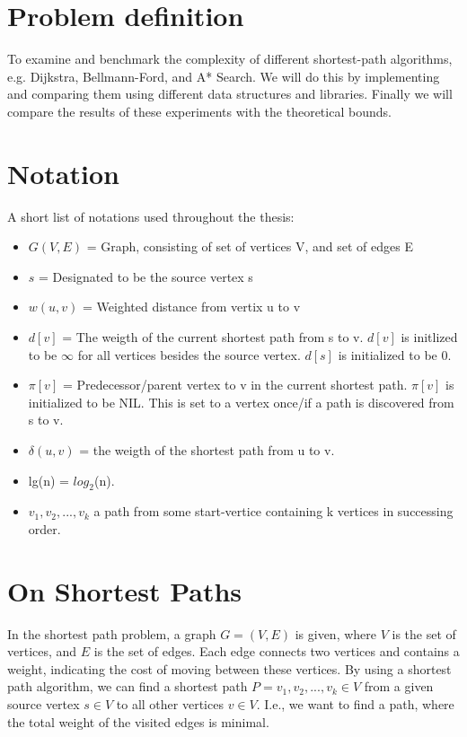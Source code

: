 \documentclass[11pt]{article}
\begin{document}
\section{Problem definition}
To examine and benchmark the complexity of different shortest-path algorithms, e.g. Dijkstra, Bellmann-Ford, and A* Search. We will do this by implementing and comparing them using different data structures and libraries. Finally we will compare the results of these experiments with the theoretical bounds.

\section{Notation}
A short list of notations used throughout the thesis:
\begin{itemize}
\item $G(V,E)$ = Graph, consisting of set of vertices V, and set of edges E
\item $s$ = Designated to be the source vertex s
\item $w(u,v)$ = Weighted distance from vertix u to v
\item $d[v]$ = The weigth of the current shortest path from s to v. $d[v]$ is initlized to be $\infty$ for all vertices besides the source vertex. $d[s]$ is initialized to be 0.
\item $\pi[v]$ = Predecessor/parent vertex to v in the current shortest path. $\pi[v]$ is initialized to be NIL. This is set to a vertex once/if a path is discovered from s to v.
\item $\delta(u,v)$ = the weigth of the shortest path from u to v.
\item lg(n) = $log_{2}$(n).
\item $v_{1}, v_{2}, ..., v_{k}$ a path from some start-vertice containing k vertices in successing order. 
\end{itemize}

\section{On Shortest Paths}
In the shortest path problem, a graph $G = (V,E)$ is given, where $V$	
is the set of vertices, and $E$ is the set of edges. Each edge
connects two vertices and contains a weight, indicating the cost of
moving between these vertices. By using a shortest path algorithm, we
can find a shortest path $P = {v_{1}, v_{2}, ..., v_{k}} \in V$ from a
given source vertex $s \in V$ to all other vertices $v \in V$. I.e.,
we want to find a path, where the total weight of the visited edges is
minimal.\\
\end{document}
